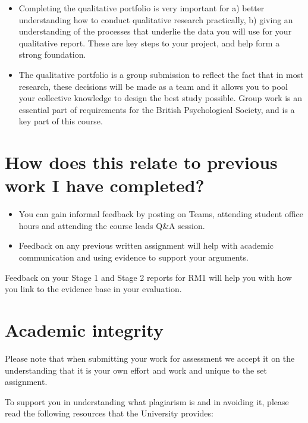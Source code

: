 \documentclass[
  english,
  letterpaper,
  DIV=11,
  numbers=noendperiod]{scrreprt}
\begin{document}
\begin{itemize}
\item
  Completing the qualitative portfolio is very important for a) better
  understanding how to conduct qualitative research practically, b)
  giving an understanding of the processes that underlie the data you
  will use for your qualitative report. These are key steps to your
  project, and help form a strong foundation.
\item
  The qualitative portfolio is a group submission to reflect the fact
  that in most research, these decisions will be made as a team and it
  allows you to pool your collective knowledge to design the best study
  possible. Group work is an essential part of requirements for the
  British Psychological Society, and is a key part of this course.
\end{itemize}

\section{How does this relate to previous work I have
completed?}\label{how-does-this-relate-to-previous-work-i-have-completed-2}

\begin{itemize}
\item
  You can gain informal feedback by posting on Teams, attending student
  office hours and attending the course leads Q\&A session.
\item
  Feedback on any previous written assignment will help with academic
  communication and using evidence to support your arguments.
\end{itemize}

Feedback on your Stage 1 and Stage 2 reports for RM1 will help you with
how you link to the evidence base in your evaluation.

\section{Academic integrity}\label{academic-integrity-1}

Please note that when submitting your work for assessment we accept it
on the understanding that it is your own effort and work and unique to
the set assignment.

To support you in understanding what plagiarism is and in avoiding it,
please read the following resources that the University provides:
\end{document}
